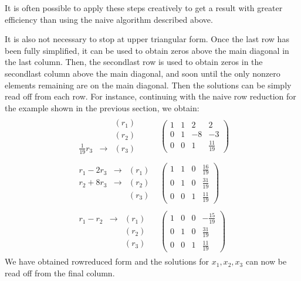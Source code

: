 \documentclass[letterpaper,10pt,english]{jupyterBook}
\begin{document}
\sphinxAtStartPar
It is often possible to apply these steps creatively to get a result with greater efficiency than using the naive algorithm described above.

\sphinxAtStartPar
It is also not necessary to stop at upper triangular form. Once the last row has been fully simplified, it can be used to obtain zeros above the main diagonal in the last column. Then, the second\sphinxhyphen{}last row is used to obtain zeros in the second\sphinxhyphen{}last column above the main diagonal, and so\sphinxhyphen{}on until the only non\sphinxhyphen{}zero elements remaining are on the main diagonal. Then the solutions can be simply read off from each row.
For instance, continuing with the naive row reduction for the example shown in the previous section, we obtain:
\begin{equation*}
\begin{split}
\begin{array}{rc}
\begin{array}{ccr}
 & & (r_1)\\
 & & (r_2)\\
 \frac{1}{19}r_3 & \longrightarrow & (r_3)
\end{array}
&
\left(
\begin{array}{ccc|c}
\boxed{1} & 1 & 2 & 2 \\
0 & \boxed{1} & -8 & -3 \\
0 & 0 & \boxed{1} & \frac{11}{19}
\end{array}
\right)\\ \\
\begin{array}{ccr}
r_1-2r_3 & \longrightarrow & (r_1)\\
r_2+8r_3 & \longrightarrow & (r_2) \\
 & & (r_3)
\end{array}
&
\left(
\begin{array}{ccc|c}
\boxed{1} & 1 & 0 & \frac{16}{19} \\
0 & \boxed{1} & 0 & \frac{31}{19} \\
0 & 0 & \boxed{1} & \frac{11}{19}
\end{array}
\right) \\ \\
\begin{array}{ccr}
r_1 - r_2 & \longrightarrow & (r_1)\\
& & (r_2) \\
& & (r_3)
\end{array}
&
\left(
\begin{array}{ccc|c}
\boxed{1} & 0 & 0 & -\frac{15}{19} \\
0 & \boxed{1} & 0 &  \frac{31}{19}\\
0 & 0 & \boxed{1} & \frac{11}{19}
\end{array}
\right)
\end{array}
\end{split}
\end{equation*}
\sphinxAtStartPar
We have obtained row\sphinxhyphen{}reduced form and the solutions for \(x_1,x_2,x_3\) can now be read off from the final column.
\end{document}
